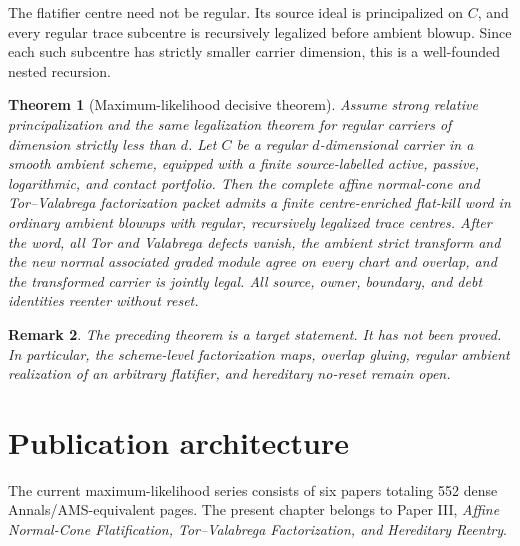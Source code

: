 \documentclass[11pt]{amsart}
\newtheorem{theorem}{Theorem}[section]
\newtheorem{remark}[theorem]{Remark}
\begin{document}
The flatifier centre need not be regular.  Its source ideal is principalized on
$C$, and every regular trace subcentre is recursively legalized before ambient
blowup.  Since each such subcentre has strictly smaller carrier dimension, this
is a well-founded nested recursion.

\begin{theorem}[Maximum-likelihood decisive theorem]
Assume strong relative principalization and the same legalization theorem for
regular carriers of dimension strictly less than $d$.  Let $C$ be a regular
$d$-dimensional carrier in a smooth ambient scheme, equipped with a finite
source-labelled active, passive, logarithmic, and contact portfolio.  Then the
complete affine normal-cone and Tor--Valabrega factorization packet admits a
finite centre-enriched flat-kill word in ordinary ambient blowups with regular,
recursively legalized trace centres.  After the word, all Tor and Valabrega
defects vanish, the ambient strict transform and the new normal associated
graded module agree on every chart and overlap, and the transformed carrier is
jointly legal.  All source, owner, boundary, and debt identities reenter without
reset.
\end{theorem}

\begin{remark}
The preceding theorem is a target statement.  It has not been proved.  In
particular, the scheme-level factorization maps, overlap gluing, regular ambient
realization of an arbitrary flatifier, and hereditary no-reset remain open.
\end{remark}

\section{Publication architecture}
The current maximum-likelihood series consists of six papers totaling 552
dense Annals/AMS-equivalent pages.  The present chapter belongs to Paper III,
\emph{Affine Normal-Cone Flatification, Tor--Valabrega Factorization, and
Hereditary Reentry}.
\end{document}
